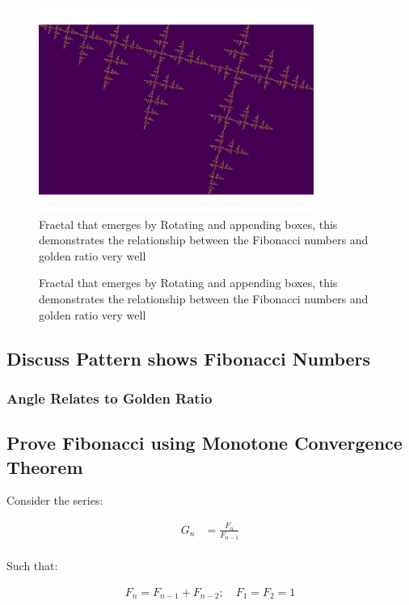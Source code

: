\documentclass[11pt]{article}
\begin{document}
\begin{figure}[htbp]
\centering
\includegraphics[width=9cm]{../Problems/fractal-dimensions/my-self-rep-frac-GR.png}
\caption{\label{My-Frac-GR}Fractal that emerges by Rotating and appending boxes, this demonstrates the relationship between the Fibonacci numbers and golden ratio very well}
\end{figure}

\begin{figure}[htbp]
\centering

\caption{\label{My-Frac-GR}Fractal that emerges by Rotating and appending boxes, this demonstrates the relationship between the Fibonacci numbers and golden ratio very well}
\end{figure}

\subsection{Discuss Pattern shows Fibonacci Numbers}
\label{sec:orgbe11c04}
\subsubsection{Angle Relates to Golden Ratio}
\label{sec:org1b634b9}
\subsection{Prove Fibonacci using Monotone Convergence Theorem}
\label{sec:org645dc7b}
Consider the series:

$$\begin{aligned}
G_n &= \frac{F_{n} }{F_{n - 1} } \\
\end{aligned}$$

Such that:

$$\begin{aligned}
F_n = F_{n- 1} +  F_{n- 2} ; \quad F_1 = F_2 = 1
\end{aligned}$$
\end{document}
